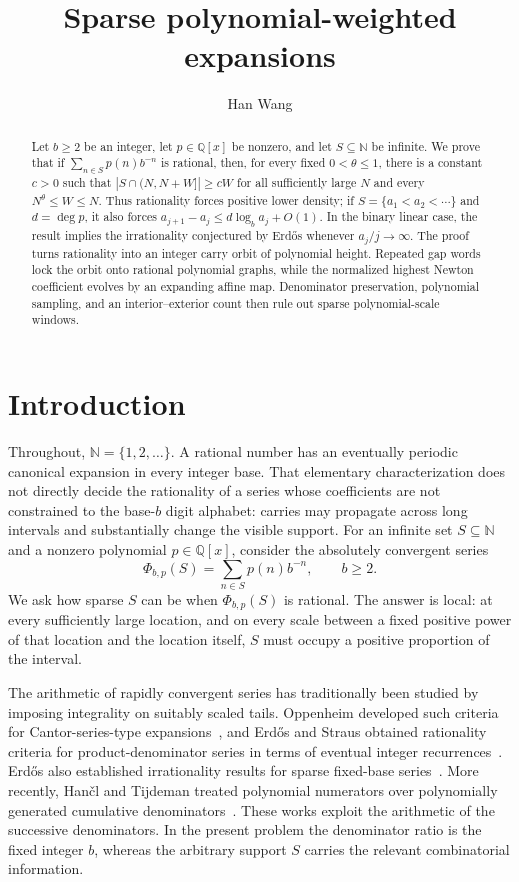 \documentclass[a4paper,10pt]{amsart}
\title{Sparse polynomial-weighted expansions}
\author{Han Wang}
\date{}
\theoremstyle{remark}
\newcommand{\N}{\mathbb N}
\newcommand{\Q}{\mathbb Q}
\begin{document}
\begin{abstract}
Let $b\ge2$ be an integer, let $p\in\Q[x]$ be nonzero, and let
$S\subseteq\N$ be infinite. We prove that if
$\sum_{n\in S}p(n)b^{-n}$ is rational, then, for every fixed
$0<\theta\le1$, there is a constant $c>0$ such that
$|S\cap(N,N+W]|\ge cW$ for all sufficiently large $N$ and every
$N^\theta\le W\le N$. Thus rationality forces positive lower density; if
$S=\{a_1<a_2<\cdots\}$ and $d=\deg p$, it also forces
$a_{j+1}-a_j\le d\log_ba_j+O(1)$. In the binary linear case, the result
implies the irrationality conjectured by Erd\H{o}s whenever $a_j/j\to\infty$.
The proof turns rationality into an integer carry orbit of polynomial height.
Repeated gap words lock the orbit onto rational polynomial graphs, while the
normalized highest Newton coefficient evolves by an expanding affine map.
Denominator preservation, polynomial sampling, and an interior--exterior
count then rule out sparse polynomial-scale windows.
\end{abstract}

\maketitle

\section{Introduction}

Throughout, $\N=\{1,2,\ldots\}$. A rational number has an eventually periodic
canonical expansion in every integer base. That elementary characterization
does not directly decide the rationality of a series whose coefficients are
not constrained to the base-$b$ digit alphabet: carries may propagate across
long intervals and substantially change the visible support. For an infinite set
$S\subseteq\N$ and a nonzero polynomial $p\in\Q[x]$, consider the absolutely
convergent series
\[
 \Phi_{b,p}(S)=\sum_{n\in S}p(n)b^{-n},\qquad b\ge2.
\]
We ask how sparse $S$ can be when $\Phi_{b,p}(S)$ is rational. The answer is
local: at every sufficiently large location, and on every scale between a
fixed positive power of that location and the location itself, $S$ must
occupy a positive proportion of the interval.

The arithmetic of rapidly convergent series has traditionally been studied
by imposing integrality on suitably scaled tails. Oppenheim developed such
criteria for Cantor-series-type expansions~\cite{Oppenheim1954}, and
Erd\H{o}s and Straus obtained rationality criteria for product-denominator
series in terms of eventual integer recurrences~\cite{ErdosStraus}. Erd\H{o}s
also established irrationality results for sparse fixed-base
series~\cite{Erdos1957}. More recently, Han\v{c}l and Tijdeman treated
polynomial numerators over polynomially generated cumulative
denominators~\cite{HanclTijdeman}. These works exploit the arithmetic of the
successive denominators. In the present problem the denominator ratio is the
fixed integer $b$, whereas the arbitrary support $S$ carries the relevant
combinatorial information.
\end{document}
